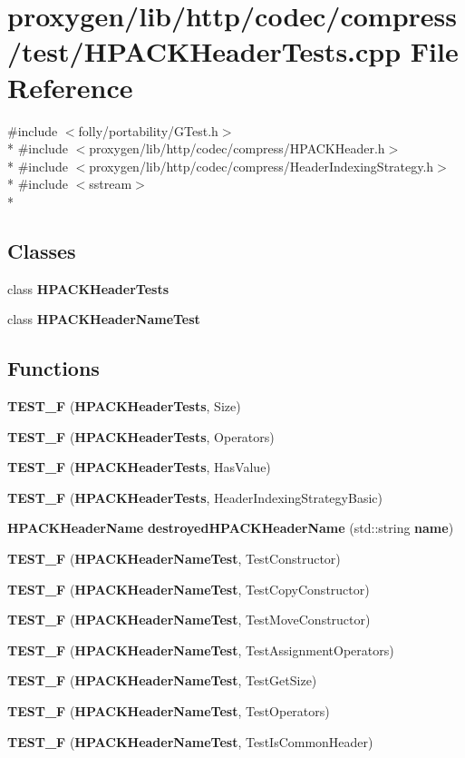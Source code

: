 \section{proxygen/lib/http/codec/compress/test/\+H\+P\+A\+C\+K\+Header\+Tests.cpp File Reference}
\label{HPACKHeaderTests_8cpp}
{\ttfamily \#include $<$folly/portability/\+G\+Test.\+h$>$}\\*
{\ttfamily \#include $<$proxygen/lib/http/codec/compress/\+H\+P\+A\+C\+K\+Header.\+h$>$}\\*
{\ttfamily \#include $<$proxygen/lib/http/codec/compress/\+Header\+Indexing\+Strategy.\+h$>$}\\*
{\ttfamily \#include $<$sstream$>$}\\*
\subsection*{Classes}
\begin{DoxyCompactItemize}
\item 
class {\bf H\+P\+A\+C\+K\+Header\+Tests}
\item 
class {\bf H\+P\+A\+C\+K\+Header\+Name\+Test}
\end{DoxyCompactItemize}
\subsection*{Functions}
\begin{DoxyCompactItemize}
\item 
{\bf T\+E\+S\+T\+\_\+F} ({\bf H\+P\+A\+C\+K\+Header\+Tests}, Size)
\item 
{\bf T\+E\+S\+T\+\_\+F} ({\bf H\+P\+A\+C\+K\+Header\+Tests}, Operators)
\item 
{\bf T\+E\+S\+T\+\_\+F} ({\bf H\+P\+A\+C\+K\+Header\+Tests}, Has\+Value)
\item 
{\bf T\+E\+S\+T\+\_\+F} ({\bf H\+P\+A\+C\+K\+Header\+Tests}, Header\+Indexing\+Strategy\+Basic)
\item 
{\bf H\+P\+A\+C\+K\+Header\+Name} {\bf destroyed\+H\+P\+A\+C\+K\+Header\+Name} (std\+::string {\bf name})
\item 
{\bf T\+E\+S\+T\+\_\+F} ({\bf H\+P\+A\+C\+K\+Header\+Name\+Test}, Test\+Constructor)
\item 
{\bf T\+E\+S\+T\+\_\+F} ({\bf H\+P\+A\+C\+K\+Header\+Name\+Test}, Test\+Copy\+Constructor)
\item 
{\bf T\+E\+S\+T\+\_\+F} ({\bf H\+P\+A\+C\+K\+Header\+Name\+Test}, Test\+Move\+Constructor)
\item 
{\bf T\+E\+S\+T\+\_\+F} ({\bf H\+P\+A\+C\+K\+Header\+Name\+Test}, Test\+Assignment\+Operators)
\item 
{\bf T\+E\+S\+T\+\_\+F} ({\bf H\+P\+A\+C\+K\+Header\+Name\+Test}, Test\+Get\+Size)
\item 
{\bf T\+E\+S\+T\+\_\+F} ({\bf H\+P\+A\+C\+K\+Header\+Name\+Test}, Test\+Operators)
\item 
{\bf T\+E\+S\+T\+\_\+F} ({\bf H\+P\+A\+C\+K\+Header\+Name\+Test}, Test\+Is\+Common\+Header)
\end{DoxyCompactItemize}


